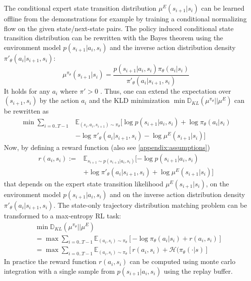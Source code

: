 \documentclass{article}
\begin{document}
The conditional expert state transition distribution $ \mu^{E}(s_{i+1}|s_{i}) $ can be learned offline from the demonstrations for example by training a conditional normalizing flow on the given state/next-state pairs. The policy induced conditional state transition distribution can be rewritten with the Bayes theorem using the environment model $p(s_{i+1}|a_i,s_i)$ and the inverse action distribution density $\pi'_{\theta}(a_{i}|s_{i+1},s_i)$:
\begin{equation}\label{eq:seperation}
\mu^{\pi_{\theta}}(s_{i+1}|s_i) = \frac{p(s_{i+1}|a_i,s_i) \pi_{\theta}(a_i|s_i)}{\pi'_{\theta}(a_{i}|s_{i+1},s_i)}
\end{equation}
It holds for any $a_i$ where $\pi' > 0$ . Thus, one can extend the expectation over $(s_{i+1},s_i)$ by the action $a_i$ and the KLD minimization $\min \mathbb{D}_{KL}(\mu^{\pi_{\theta}}||\mu^{E})$ can be rewritten as
\begin{equation}\label{eq:kldsoiltdm}
\begin{aligned}
\min \sum_{i = 0..T-1} & \mathbb{E}_{(s_i,a_i,s_{i+1}) \sim {\pi_{\theta}}}[\log p(s_{i+1}|a_i,s_i) + \log \pi_{\theta}(a_i|s_i) \\ & - \log \pi'_{\theta}(a_{i}|s_{i+1},s_i)  - \log  \mu^{E}(s_{i+1}|s_i)]
\end{aligned}
\end{equation}
Now, by defining a reward function (also see \ref{appendix:assumptions})
\begin{equation}\label{eq:rewardsoiltdm}
\begin{aligned}
r(a_i, s_i) := & \mathbb{E}_{s_{i+1} \sim p(s_{i+1}|a_i,s_i)} [-\log p(s_{i+1}|a_i,s_i) \\&  + \log \pi'_{\theta}(a_{i}|s_{i+1},s_i) + \log  \mu^{E}(s_{i+1}|s_i)]
\end{aligned}
\end{equation}
 that depends on the expert state transition likelihood $\mu^{E}(s_{i+1}|s_i)$, on the environment model $p(s_{i+1}|a_i,s_i)$ and on the inverse action distribution density $\pi'_{\theta}(a_{i}|s_{i+1},s_i)$. The state-only trajectory distribution matching problem can be transformed to a max-entropy RL task:
\begin{equation}\label{eq:maxentropyequivalence}
\begin{aligned}
& \min \mathbb{D}_{KL}(\mu^{\pi_{\theta}}||\mu^{E})  \\& = \max \sum_{i = 0..T-1}  \mathbb{E}_{(a_i,s_i) \sim \pi_{\theta}}[ -\log \pi_{\theta}(a_i|s_i) + r(a_i, s_i)]\\
& = \max \sum_{i = 0..T-1}  \mathbb{E}_{(a_i,s_i) \sim \pi_{\theta}}[r(a_i, s_i) + \mathcal{H}(\pi_{\theta}(\cdot|s)]
\end{aligned}
\end{equation}
In practice the reward function $r(a_i,s_i)$ can be computed using monte carlo integration with a single sample from $p(s_{i+1}|a_i,s_i)$ using the replay buffer. 
\end{document}
